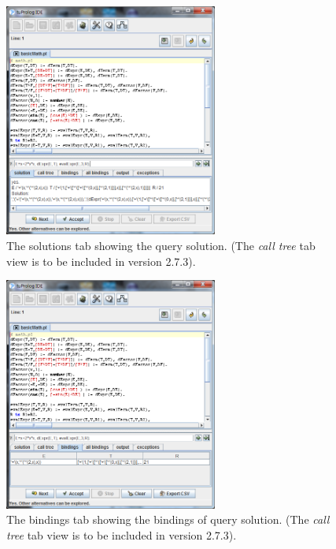 \begin{figure}
\centering
\includegraphics[width=7cm]{images/gui-solutions}
\caption{The solutions tab showing the query solution.
(The \textit{call tree} tab view is to be included in version 2.7.3).}
\label{fig:gui-solutions}
\end{figure}

\begin{figure}
\centering
\includegraphics[width=7cm]{images/gui-bindings}
\caption{The bindings tab showing the bindings of query solution.
(The \textit{call tree} tab view is to be included in version 2.7.3).}
\label{fig:gui-bindings}
\end{figure}

